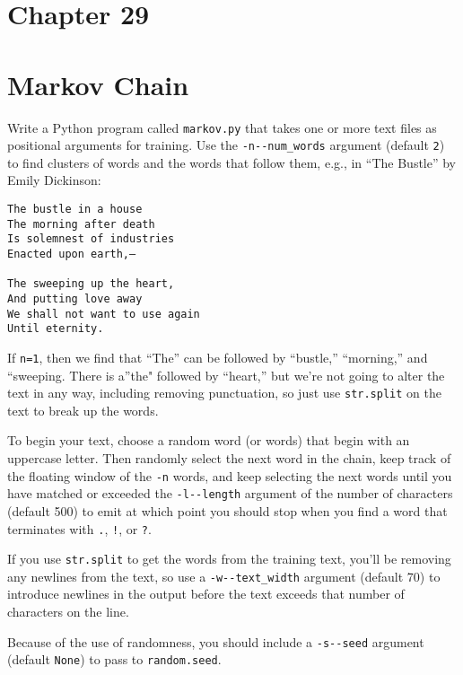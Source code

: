 \documentclass[]{article}
\begin{document}
\pagebreak

\hypertarget{chapter-29}{%
\section{Chapter 29}\label{chapter-29}}

\hypertarget{markov-chain}{%
\section{Markov Chain}\label{markov-chain}}

Write a Python program called \texttt{markov.py} that takes one or more
text files as positional arguments for training. Use the
\texttt{-n\textbar{}-\/-num\_words} argument (default \texttt{2}) to
find clusters of words and the words that follow them, e.g., in ``The
Bustle'' by Emily Dickinson:

\begin{verbatim}
The bustle in a house
The morning after death
Is solemnest of industries
Enacted upon earth,—

The sweeping up the heart,
And putting love away
We shall not want to use again
Until eternity.
\end{verbatim}

If \texttt{n=1}, then we find that ``The'' can be followed by
``bustle,'' ``morning,'' and ``sweeping. There is a''the" followed by
``heart,'' but we're not going to alter the text in any way, including
removing punctuation, so just use \texttt{str.split} on the text to
break up the words.

To begin your text, choose a random word (or words) that begin with an
uppercase letter. Then randomly select the next word in the chain, keep
track of the floating window of the \texttt{-n} words, and keep
selecting the next words until you have matched or exceeded the
\texttt{-l\textbar{}-\/-length} argument of the number of characters
(default 500) to emit at which point you should stop when you find a
word that terminates with \texttt{.}, \texttt{!}, or \texttt{?}.

If you use \texttt{str.split} to get the words from the training text,
you'll be removing any newlines from the text, so use a
\texttt{-w\textbar{}-\/-text\_width} argument (default 70) to introduce
newlines in the output before the text exceeds that number of characters
on the line.

Because of the use of randomness, you should include a
\texttt{-s\textbar{}-\/-seed} argument (default \texttt{None}) to pass
to \texttt{random.seed}.
\end{document}
